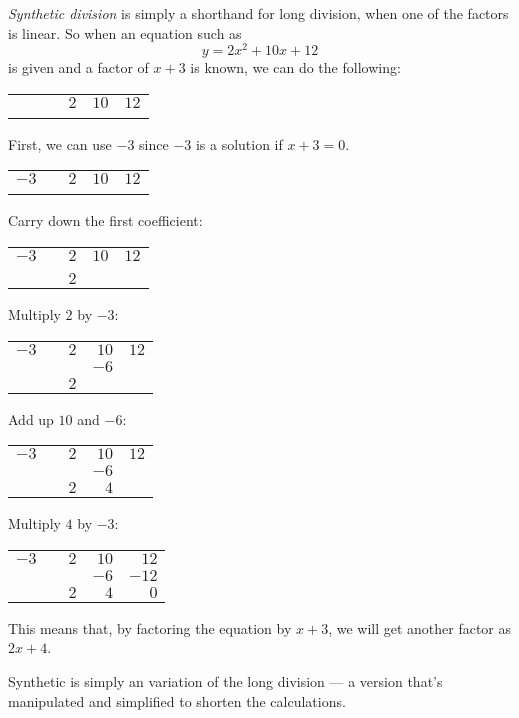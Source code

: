 \documentclass[12pt]{article}
\begin{document}
\emph{Synthetic division} is simply a shorthand for long division, 
when one of the factors is linear.  
So when an equation such as $$y = 2x^2 + 10x + 12$$ 
is given and a factor of $x+3$ is known, we can do the following:

\begin{tabular}{lcrrr}
$\phantom{-3}$ &\vline& $2$ & $10$ & $12$\\
   &\vline&   &    &   \\
   \cline{2-5}
\end{tabular}

First, we can use $-3$ since $-3$ is a solution if $x+3=0$.

\begin{tabular}{lcrrr}
$-3$ &\vline& $2$ & $10$ & $12$\\
   &\vline&   &    &   \\
   \cline{2-5}
\end{tabular}

Carry down the first coefficient:

\begin{tabular}{lcrrr}
$-3$ &\vline& $2$ & $10$ & $12$\\
   &\vline&   &    &   \\
   \cline{2-5}
   && $2$  &    &   \\
\end{tabular}

Multiply $2$ by $-3$:

\begin{tabular}{lcrrr}
$-3$ &\vline& $2$ & $10$ & $12$\\
   &\vline&   & $-6$   &   \\
   \cline{2-5}
   && $2$  &    &   \\
\end{tabular}

Add up $10$ and $-6$:

\begin{tabular}{lcrrr}
$-3$ &\vline& $2$ & $10$ & $12$\\
   &\vline&   & $-6$   &   \\
   \cline{2-5}
   && $2$  & $4$   &   \\
\end{tabular}

Multiply $4$ by $-3$:

\begin{tabular}{lcrrr}
$-3$ &\vline& $2$ & $10$ & $12$\\
   &\vline&   & $-6$   & $-12$  \\
   \cline{2-5}
   && $2$  & $4$   & $0$  \\
\end{tabular}

This means that, by factoring the equation by $x+3$, we will get another factor as $2x+4$.

Synthetic is simply an variation of the long division --- a version that's manipulated and simplified to shorten the calculations.
\end{document}
